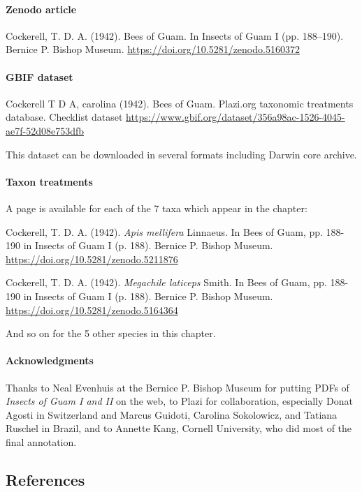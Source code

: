 \documentclass[12pt,letterpaper,english,bibliography=totocnumbered, abstract=on]{scrartcl}
\begin{document}
\paragraph{Zenodo article} Cockerell, T. D. A. (1942). Bees of Guam. In Insects of Guam I (pp. 188–190). Bernice P. Bishop Museum. \url{https://doi.org/10.5281/zenodo.5160372}

\paragraph{GBIF dataset} Cockerell T D A, carolina (1942). Bees of Guam. Plazi.org taxonomic treatments database. Checklist dataset \url{https://www.gbif.org/dataset/356a98ac-1526-4045-ae7f-52d08e753dfb} 

This dataset can be downloaded in several formats including Darwin core archive.

\paragraph{Taxon treatments} A page is available for each of the 7 taxa which appear in the chapter:

\medskip
Cockerell, T. D. A. (1942). \textit{Apis mellifera} Linnaeus. In Bees of Guam, pp. 188-190 in Insects of Guam I (p. 188). Bernice P. Bishop Museum. \url{https://doi.org/10.5281/zenodo.5211876}

\medskip
Cockerell, T. D. A. (1942). \textit{Megachile laticeps} Smith. In Bees of Guam, pp. 188-190 in Insects of Guam I (p. 188). Bernice P. Bishop Museum. \url{https://doi.org/10.5281/zenodo.5164364}

\medskip
And so on for the 5 other species in this chapter.

\paragraph{Acknowledgments} Thanks to Neal Evenhuis at the Bernice P. Bishop Museum for putting PDFs of \textit{Insects of Guam I and II} on the web, to Plazi for collaboration, especially Donat Agosti in Switzerland and Marcus Guidoti, Carolina Sokolowicz, and Tatiana Ruschel in Brazil, and to Annette Kang, Cornell University, who did most of the final annotation.

\subsection{References}
\printbibliography[heading=none]
\end{document}
